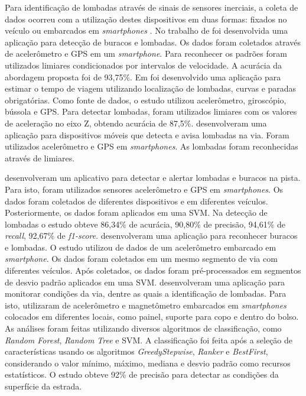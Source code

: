 Para identificação de lombadas através de sinais de sensores inerciais, a coleta de dados ocorreu com a utilização destes dispositivos em duas formas: fixados no veículo \cite{Sabir2019,Padilla2018} ou embarcados em \textit{smartphones} \cite{Fouad2014,Alam2020,Rishiwal2016,Wang2018,Verma2016,Souza2018,Edwan2019,Savera2016,Idris2019,Dey2019,Aljaafreh2017,Aragon2016}. No trabalho de  foi desenvolvida uma aplicação para detecção de buracos e lombadas. Os dados foram coletados através de acelerômetro e GPS em um \textit{smartphone}. Para reconhecer os padrões foram utilizados limiares condicionados por intervalos de velocidade. A acurácia da abordagem proposta foi de 93,75\%. Em  foi desenvolvido uma aplicação para estimar o tempo de viagem utilizando localização de lombadas, curvas e paradas obrigatórias. Como fonte de dados, o estudo utilizou acelerômetro, giroscópio, bússola e GPS. Para detectar lombadas, foram utilizados limiares com os valores de aceleração no eixo Z, obtendo acurácia de 87,5\%.  desenvolveram uma aplicação para dispositivos móveis que detecta e avisa lombadas na via. Foram utilizados acelerômetro e GPS em \textit{smartphones}. As lombadas foram reconhecidas através de limiares.

 desenvolveram um aplicativo para detectar e alertar lombadas e buracos na pista. Para isto, foram utilizados sensores acelerômetro e GPS em \textit{smartphones}. Os dados foram coletados de diferentes dispositivos e em diferentes veículos. Posteriormente, os dados foram aplicados em uma SVM. Na detecção de lombadas o estudo obteve 86,34\% de acurácia, 90,80\% de precisão, 94,61\% de \textit{recall}, 92,67\% de \textit{f1-score}.  desenvolveram uma aplicação para reconhecer buracos e lombadas. O estudo utilizou de dados de um acelerômetro embarcado em \textit{smartphone}. Os dados foram coletados em um mesmo segmento de via com diferentes veículos. Após coletados, os dados foram pré-processados em segmentos de desvio padrão aplicados em uma SVM.  desenvolveram uma aplicação para monitorar condições da via, dentre as quais a identificação de lombadas. Para isto, utilizaram de acelerômetro e magnetômetro embarcados em \textit{smartphones} colocados em diferentes locais, como painel, suporte para copo e dentro do bolso. As análises foram feitas utilizando diversos algoritmos de classificação, como \textit{Random Forest}, \textit{Random Tree} e SVM. A classificação foi feita após a seleção de características usando os algoritmos \textit{GreedyStepwise}, \textit{Ranker} e \textit{BestFirst}, considerando o valor mínimo, máximo, mediana e desvio padrão como recursos estatísticos. O estudo obteve 92\% de precisão para detectar as condições da superfície da estrada.

